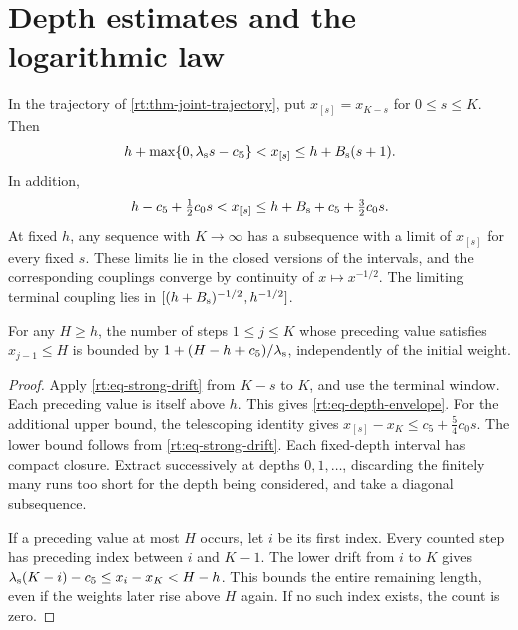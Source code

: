 \documentclass[11pt,letterpaper,reqno]{amsart}
\makeatletter
\numberwithin{equation}{section}
\theoremstyle{definition}
\newcommand{\ms@minorstart}{%
  \pushQED{\qed}\renewcommand{\qedsymbol}{$\blacksquare$}}
\newenvironment{proposition}[1][]{\ms@minorstart\ms@proposition[#1]}
  {\popQED\endms@proposition}
\theoremstyle{remark}
\makeatother
\begin{document}
\section{Depth estimates and the logarithmic law}
\label{rt:sec-first-passage}

\begin{proposition}[Terminal-depth bounds]
\label{rt:prop-depth-envelopes}
In the trajectory of \cref{rt:thm-joint-trajectory}, put
\(x_{[s]}=x_{K-s}\) for \(0\le s\le K\). Then
\begin{equation}\label{rt:eq-depth-envelope}
  h+\max\{0,\lambda_{\rm s}s-c_5\}< x_{[s]}
                              \le h+B_{\rm s}(s+1).
\end{equation}
In addition,
\[
 h-c_5+\tfrac12c_0s<x_{[s]}
       \le h+B_{\rm s}+c_5+\tfrac32c_0s .
\]
At fixed \(h\), any sequence with \(K\to\infty\) has a
subsequence with a limit of \(x_{[s]}\) for every fixed \(s\).
These limits lie in the closed versions of the intervals, and
the corresponding couplings converge by continuity of
\(x\mapsto x^{-1/2}\). The limiting terminal coupling lies in
\([(h+B_{\rm s})^{-1/2},h^{-1/2}]\).

For any \(H\ge h\), the number of steps \(1\le j\le K\)
whose preceding value satisfies \(x_{j-1}\le H\) is bounded by
\(1+(H-h+c_5)/\lambda_{\rm s}\), independently of the initial
weight.
\end{proposition}
\begin{proof}
Apply \cref{rt:eq-strong-drift} from \(K-s\) to \(K\), and use
the terminal window. Each preceding value is itself above \(h\).
This gives \cref{rt:eq-depth-envelope}. For the additional
upper bound, the telescoping identity gives
\(x_{[s]}-x_K\le c_5+\tfrac54c_0s\). The lower bound follows
from \cref{rt:eq-strong-drift}. Each fixed-depth interval has
compact closure. Extract successively at depths \(0,1,\ldots\),
discarding the finitely many runs too short for the depth being
considered, and take a diagonal subsequence.

If a preceding value at most \(H\) occurs, let \(i\) be its
first index. Every counted step has preceding index between
\(i\) and \(K-1\). The lower drift from \(i\) to \(K\) gives
\(\lambda_{\rm s}(K-i)-c_5\le x_i-x_K<H-h\).
This bounds the entire remaining length, even if the weights
later rise above \(H\) again. If no such index exists, the
count is zero.
\end{proof}
\end{document}
